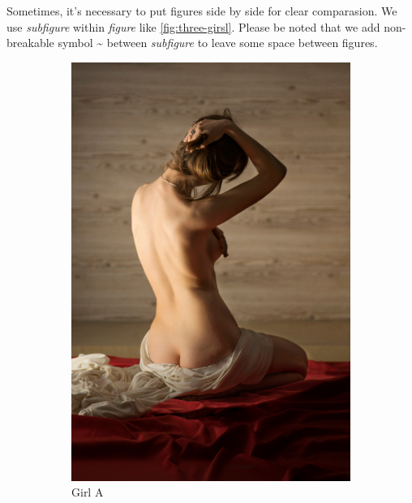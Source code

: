 Sometimes, it's necessary to put figures side by side for clear
comparasion. We use \textit{subfigure} within \textit{figure} like
\ref{fig:three-girsl}. Please be noted that we add non-breakable
symbol \textasciitilde{} between \textit{subfigure} to leave
some space between figures.

\begin{figure}[tbp]
  \centering
  \begin{subfigure}[tbp]{0.3\linewidth}
    \includegraphics[width=\linewidth]{sub1}
    \caption{Girl A}
  \end{subfigure}
  ~
  \begin{subfigure}[tbp]{0.3\linewidth}

\end{subfigure}
\end{figure}
